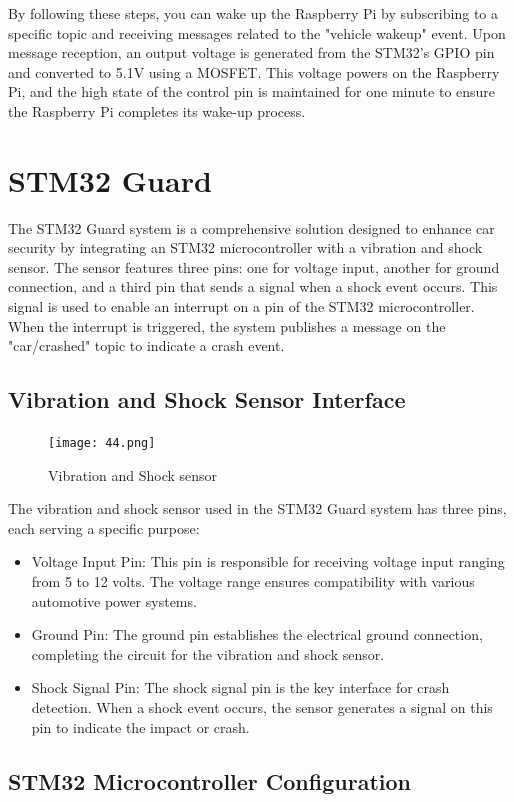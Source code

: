 \documentclass[
12pt,
oneside, 
onehalfspacing, 
nolistspacing, 
parskip, 
chapterinoneline, 
]{AASTCOMPUTER}
\begin{document}
By following these steps, you can wake up the Raspberry Pi by subscribing to a specific topic and receiving messages related to the "vehicle wakeup" event. Upon message reception, an output voltage is generated from the STM32's GPIO pin and converted to 5.1V using a MOSFET. This voltage powers on the Raspberry Pi, and the high state of the control pin is maintained for one minute to ensure the Raspberry Pi completes its wake-up process.
\section{STM32 Guard}

The STM32 Guard system is a comprehensive solution designed to enhance car security by integrating an STM32 microcontroller with a vibration and shock sensor. The sensor features three pins: one for voltage input, another for ground connection, and a third pin that sends a signal when a shock event occurs. This signal is used to enable an interrupt on a pin of the STM32 microcontroller. When the interrupt is triggered, the system publishes a message on the "car/crashed" topic to indicate a crash event.

\subsection{Vibration and Shock Sensor Interface}
\begin{figure}[!ht]
\centering
\texttt{[image: 44.png]}
\caption[Vibration and shock sensor]{Vibration and Shock sensor}
\label{fig:TCU}
\end{figure}
The vibration and shock sensor used in the STM32 Guard system has three pins, each serving a specific purpose:

\begin{itemize}
  \item Voltage Input Pin: This pin is responsible for receiving voltage input ranging from 5 to 12 volts. The voltage range ensures compatibility with various automotive power systems.
  \item Ground Pin: The ground pin establishes the electrical ground connection, completing the circuit for the vibration and shock sensor.
  \item Shock Signal Pin: The shock signal pin is the key interface for crash detection. When a shock event occurs, the sensor generates a signal on this pin to indicate the impact or crash.
\end{itemize}

\subsection{STM32 Microcontroller Configuration}
\end{document}
